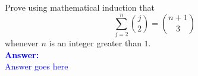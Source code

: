 \item{}
Prove using mathematical induction that $$\sum_{j=2}^n{j\choose2}={n+1\choose
3}$$ whenever $n$ is an integer greater than $1$.\\[12pt]
\ifanswers
\textcolor{blue}{
\textbf{Answer:}\\[6pt]
Answer goes here
}
\newpage
\fi
